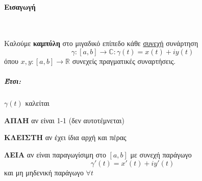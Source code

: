 \documentclass[12pt,a4paper,notitlepage,fleqn]{article}
\begin{document}
	\paragraph{Εισαγωγή} \hspace{0pt}\\

	\begin{defn*}{}
        Καλούμε \textbf{καμπύλη} στο μιγαδικό επίπεδο κάθε \underline{συνεχή} συνάρτηση
        \[
        \gamma:[a,b]\to\mathbb C :\gamma(t)=x(t)+iy(t)
        \]
        όπου \( x,y:[a,b]\to\mathbb R  \) συνεχείς πραγματικές συναρτήσεις.
	\end{defn*}

	\subparagraph{Έτσι:} \( \gamma(t) \) καλείται
	\begin{invitemize}
		\item \textbf{ΑΠΛΗ} αν είναι 1-1 (δεν αυτοτέμνεται)
		\item \textbf{ΚΛΕΙΣΤΗ} αν έχει ίδια αρχή και πέρας
		\item \textbf{ΛΕΙΑ} αν είναι παραγωγίσιμη στο \( [a,b] \) με συνεχή παράγωγο
		\[
		\gamma'(t)=x'(t)+iy'(t)
		\]
		και μη μηδενική παράγωγο \( \forall t \)
	\end{invitemize}
\end{document}
